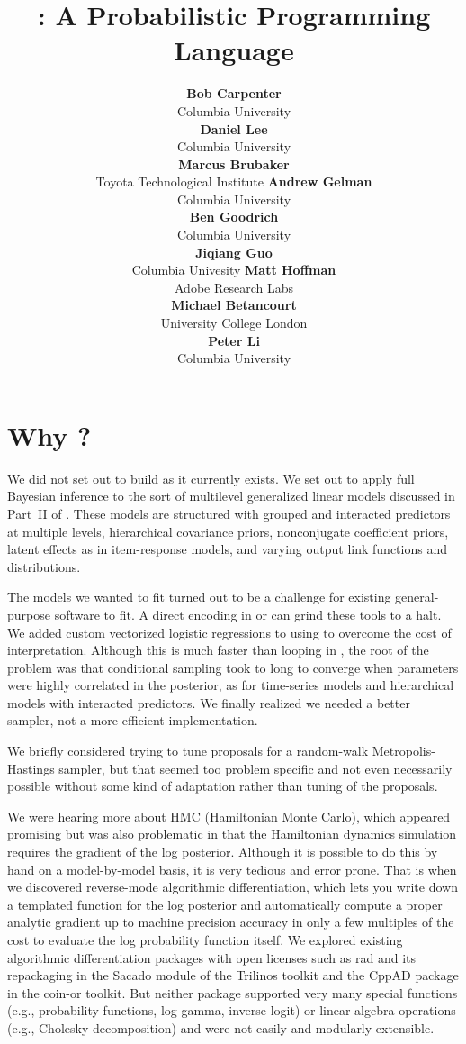 \documentclass[article]{jss}
\author{{\bf\large Bob Carpenter}
        \\ Columbia University
        \\[9pt]
        {\bf\large Daniel Lee}
        \\ Columbia University
        \\[9pt]
        {\bf\large Marcus Brubaker}
        \\ Toyota Technological Institute
    \And
        {\bf\large Andrew Gelman}
        \\ Columbia University
        \\[9pt]
        {\bf\large Ben Goodrich}
        \\ Columbia University
        \\[9pt]
        {\bf\large Jiqiang Guo}
        \\ Columbia Univesity
     \And
        {\bf\large Matt Hoffman}
        \\ Adobe Research Labs
        \\[9pt]
        {\bf\large Michael Betancourt}
        \\ University College London
        \\[9pt]
        {\bf\large Peter Li}
        \\ Columbia University
}
\title{\proglang{Stan}: A Probabilistic Programming Language}
\begin{document}

\section[Why Stan?]{Why ?}

We did not set out to build  as it currently exists.
We set out to apply full Bayesian inference to the sort of multilevel
generalized linear models discussed in Part~II of
\citep{GelmanHill:2007}.  These models are structured with grouped and
interacted predictors at multiple levels, hierarchical covariance
priors, nonconjugate coefficient priors, latent effects as in
item-response models, and varying output link functions and
distributions.

The models we wanted to fit turned out to be a challenge for existing
general-purpose software to fit.  A direct encoding in 
or  can grind these tools to a halt.  We added custom
vectorized logistic regressions to  using
 to overcome the cost of interpretation.  Although this
is much faster than looping in , the root of the
problem was that conditional sampling took to long to converge when
parameters were highly correlated in the posterior, as for time-series
models and hierarchical models with interacted predictors.  We finally
realized we needed a better sampler, not a more efficient
implementation.

We briefly considered trying to tune proposals for a random-walk
Metropolis-Hastings sampler, but that seemed too problem specific and
not even necessarily possible without some kind of adaptation rather
than tuning of the proposals. 

We were hearing more about HMC (Hamiltonian Monte Carlo), which
appeared promising but was also problematic in that the Hamiltonian
dynamics simulation requires the gradient of the log posterior.
Although it is possible to do this by hand on a model-by-model basis,
it is very tedious and error prone.  That is when we discovered
reverse-mode algorithmic differentiation, which lets you write down a
templated  function for the log posterior and
automatically compute a proper analytic gradient up to machine
precision accuracy in only a few multiples of the cost to evaluate the
log probability function itself.  We explored existing algorithmic
differentiation packages with open licenses such as {\sc rad}
\citep{Gay:2005} and its repackaging in the Sacado module of the
Trilinos toolkit and the {\small CppAD} package in the {\sc coin-or}
toolkit.  But neither package supported very many special functions
(e.g., probability functions, log gamma, inverse logit) or linear
algebra operations (e.g., Cholesky decomposition) and were not easily
and modularly extensible.
\end{document}
